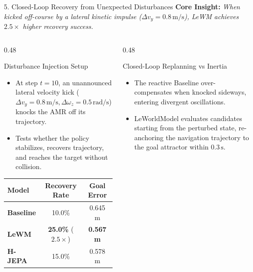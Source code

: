 \documentclass[aspectratio=169, 10pt]{beamer}
\begin{document}
\begin{frame}{5. Closed-Loop Recovery from Unexpected Disturbances}
  \textbf{Core Insight:} \textit{When kicked off-course by a lateral kinetic impulse ($\Delta v_y = 0.8\,\text{m/s}$), LeWM achieves $2.5\times$ higher recovery success.}

  \vspace{0.3cm}
  \begin{columns}[T]
    \begin{column}{0.48\textwidth}
      \begin{block}{Disturbance Injection Setup}
        \small
        \begin{itemize}
          \item At step $t=10$, an unannounced lateral velocity kick ($\Delta v_y = 0.8\,\text{m/s}, \Delta \omega_z = 0.5\,\text{rad/s}$) knocks the AMR off its trajectory.
          \item Tests whether the policy stabilizes, recovers trajectory, and reaches the target without collision.
        \end{itemize}
      \end{block}

      \vspace{0.2cm}
      \begin{tabular}{lcc}
        \toprule
        \textbf{Model} & \textbf{Recovery Rate} & \textbf{Goal Error} \\
        \midrule
        \textbf{Baseline} & 10.0\% & 0.645 m \\
        \textbf{LeWM} & \textbf{25.0\%} ($2.5\times$) & \textbf{0.567 m} \\
        \textbf{H-JEPA} & 15.0\% & 0.578 m \\
        \bottomrule
      \end{tabular}
    \end{column}

    \begin{column}{0.48\textwidth}
      \begin{alertblock}{Closed-Loop Replanning vs Inertia}
        \small
        \begin{itemize}
          \item The reactive Baseline over-compensates when knocked sideways, entering divergent oscillations.
          \item LeWorldModel evaluates candidates starting from the perturbed state, re-anchoring the navigation trajectory to the goal attractor within $0.3\,\text{s}$.
        \end{itemize}
      \end{alertblock}
    \end{column}
  \end{columns}
\end{frame}
\end{document}
